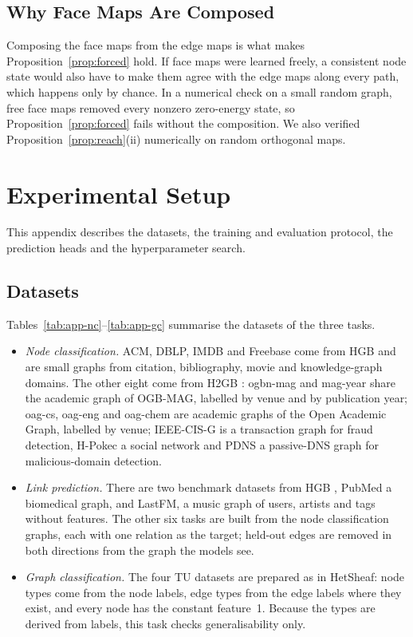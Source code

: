 \documentclass{article}
\begin{document}
\subsection{Why Face Maps Are Composed}
Composing the face maps from the edge maps is what makes Proposition~\ref{prop:forced} hold. If face maps were learned freely, a consistent node state would also have to make them agree with the edge maps along every path, which happens only by chance. In a numerical check on a small random graph, free face maps removed every nonzero zero-energy state, so Proposition~\ref{prop:forced} fails without the composition. We also verified Proposition~\ref{prop:reach}(ii) numerically on random orthogonal maps.


\section{Experimental Setup}
\label{app:data}
This appendix describes the datasets, the training and evaluation protocol, the prediction heads and the hyperparameter search.

\subsection{Datasets}
Tables~\ref{tab:app-nc}--\ref{tab:app-gc} summarise the datasets of the three tasks.
\begin{itemize}
  \item \emph{Node classification.} ACM, DBLP, IMDB and Freebase come from HGB \cite{lv2021hgb} and are small graphs from citation, bibliography, movie and knowledge-graph domains. The other eight come from H2GB \cite{lin2025heterophily}: ogbn-mag and mag-year share the academic graph of OGB-MAG, labelled by venue and by publication year; oag-cs, oag-eng and oag-chem are academic graphs of the Open Academic Graph, labelled by venue; IEEE-CIS-G is a transaction graph for fraud detection, H-Pokec a social network and PDNS a passive-DNS graph for malicious-domain detection.
  \item \emph{Link prediction.} There are two benchmark datasets from HGB \cite{lv2021hgb}, PubMed a biomedical graph, and LastFM, a music graph of users, artists and tags without features. The other six tasks are built from the node classification graphs, each with one relation as the target; held-out edges are removed in both directions from the graph the models see.
  \item \emph{Graph classification.} The four TU datasets \cite{morris2020tudataset} are prepared as in HetSheaf: node types come from the node labels, edge types from the edge labels where they exist, and every node has the constant feature~1. Because the types are derived from labels, this task checks generalisability only.
\end{itemize}
\end{document}
